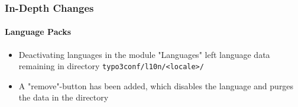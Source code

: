 \begin{frame}[fragile]
	\frametitle{In-Depth Changes}
	\framesubtitle{Language Packs}

	\begin{itemize}
		\item Deactivating languages in the module "Languages" left language data remaining
			in directory \texttt{typo3conf/l10n/<locale>/}
		\item A "remove"-button has been added, which disables the language and purges the
			data in the directory
	\end{itemize}

\end{frame}








